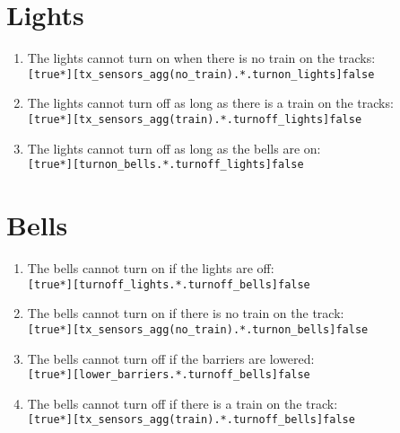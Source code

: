 \documentclass[final]{report}
\begin{document}
\section{Lights}

\begin{enumerate}
    \item The lights cannot turn on when there is no train on the tracks:\\
        \texttt{[true*][tx\_sensors\_agg(no\_train).*.turnon\_lights]false}

    \item The lights cannot turn off as long as there is a train on the tracks:\\
        \texttt{[true*][tx\_sensors\_agg(train).*.turnoff\_lights]false}

    \item The lights cannot turn off as long as the bells are on:\\
        \texttt{[true*][turnon\_bells.*.turnoff\_lights]false}
\end{enumerate}


\section{Bells}

\begin{enumerate}
    \item The bells cannot turn on if the lights are off:\\
        \texttt{[true*][turnoff\_lights.*.turnoff\_bells]false}

    \item The bells cannot turn on if there is no train on the track:\\
        \texttt{[true*][tx\_sensors\_agg(no\_train).*.turnon\_bells]false}

    \item The bells cannot turn off if the barriers are lowered:\\
        \texttt{[true*][lower\_barriers.*.turnoff\_bells]false}

    \item The bells cannot turn off if there is a train on the track:\\
        \texttt{[true*][tx\_sensors\_agg(train).*.turnoff\_bells]false}
\end{enumerate}
\end{document}
